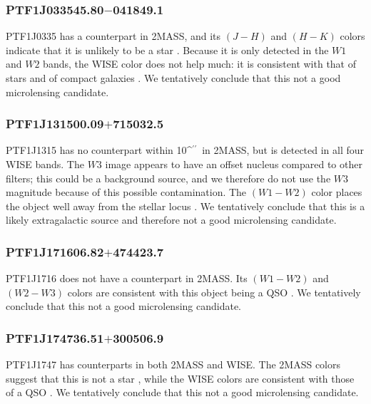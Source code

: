 \documentclass{emulateapj}
\def\asec{\ifmmode^{\prime\prime}\else$^{\prime\prime}$\fi}
\begin{document}
\subsubsection*{PTF1J033545.80$-$041849.1} %
PTF1J0335 has a counterpart in 2MASS, and its $(J-H)$ and $(H-K)$ colors indicate that it is unlikely to be a star \citep{kev07}. Because it is only detected in the $W1$ and $W2$ bands, the WISE color does not help much: it is consistent with that of stars and of compact galaxies \citep[cf.\ Figure 14 in][]{yan2013}. We tentatively conclude that this not a good microlensing candidate. 

\subsubsection*{PTF1J131500.09$+$715032.5} %
PTF1J1315 has no counterpart within 10\asec\ in 2MASS, but is detected in all four WISE bands. %
The $W3$ image appears to have an offset nucleus compared to other filters; this could be a background source, and we therefore do not use the $W3$ magnitude because of this possible contamination. The $(W1-W2)$ color places the object well away from the stellar locus \citep[cf.\ Figure 14 in][]{yan2013}. We tentatively conclude that this is a likely extragalactic source and therefore not a good microlensing candidate. 

\subsubsection*{PTF1J171606.82$+$474423.7} %
PTF1J1716 does not have a counterpart in 2MASS. Its $(W1-W2)$ and $(W2-W3)$ colors are consistent with this object being a QSO \citep[cf.\ Figure 14 in][]{yan2013}. We tentatively conclude that this not a good microlensing candidate. 
\subsubsection*{PTF1J174736.51$+$300506.9} %
PTF1J1747 has counterparts in both 2MASS and WISE. The 2MASS colors suggest that this is not a star \citep{kev07}, while the WISE colors are consistent with those of a QSO \citep[cf.\ Figure 14 in][]{yan2013}. %
We tentatively conclude that this not a good microlensing candidate. 
\end{document}
